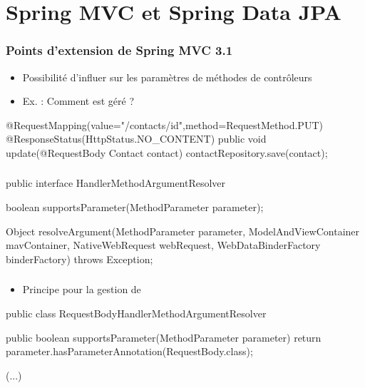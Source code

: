 \section{Spring MVC et Spring Data JPA}


\begin{frame}[fragile]
 \frametitle{Points d'extension de Spring MVC 3.1}
 \begin{itemize}
  \item Possibilité d'influer sur les paramètres de méthodes de contrôleurs
  \item Ex. : Comment est géré  ?
 \end{itemize}
 \begin{javacode}
@RequestMapping(value="/contacts/{id}",method=RequestMethod.PUT)
@ResponseStatus(HttpStatus.NO_CONTENT)
public void update(@RequestBody Contact contact) {
  contactRepository.save(contact);
}
 \end{javacode}

\end{frame}

\begin{frame}[fragile]
 \frametitle{}
 \begin{javacode}
public interface HandlerMethodArgumentResolver {

  boolean supportsParameter(MethodParameter parameter);

  Object resolveArgument(MethodParameter parameter, 
     ModelAndViewContainer mavContainer,
     NativeWebRequest webRequest, 
     WebDataBinderFactory binderFactory) throws Exception;

}
 \end{javacode}

\end{frame}

\begin{frame}[fragile]
 \frametitle{}
 \begin{itemize}
  \item Principe pour la gestion de 
 \end{itemize}
 \begin{javacode}
public class RequestBodyHandlerMethodArgumentResolver {

  public boolean supportsParameter(MethodParameter parameter) {
    return parameter.hasParameterAnnotation(RequestBody.class);
  }

  (...)

}
 \end{javacode}

\end{frame}

